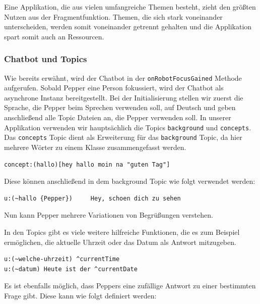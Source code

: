 Eine Applikation, die aus vielen umfangreiche Themen besteht, zieht den größten Nutzen aus der Fragmentfunktion. Themen, die sich stark voneinander unterscheiden, werden somit voneinander getrennt gehalten und die Applikation spart somit auch an Ressourcen.\\

\subsubsection{Chatbot und Topics}

Wie bereits erwähnt, wird der Chatbot in der \verb|onRobotFocusGained| Methode aufgerufen. Sobald Pepper eine Person fokussiert, wird der Chatbot als asynchrone Instanz bereitgestellt. Bei der Initialisierung stellen wir zuerst die Sprache, die Pepper beim Sprechen verwenden soll, auf Deutsch und geben anschließend alle Topic Dateien an, die Pepper verwenden soll. In unserer Applikation verwenden wir hauptsächlich die Topics \verb|background| und \verb|concepts|. Das \verb|concepts| Topic dient als Erweiterung für das \verb|background| Topic, da hier mehrere Wörter zu einem Klasse zusammengefasst werden.\\

\begin{lstlisting}[caption={Konzept - Beispiel}]
concept:(hallo)[hey hallo moin na "guten Tag"]
\end{lstlisting}

Diese können anschließend in dem background Topic wie folgt verwendet werden:\\

\begin{lstlisting}[caption={Topic - Beispiel}]
u:(~hallo {Pepper}) 	Hey, schoen dich zu sehen
\end{lstlisting}

Nun kann Pepper mehrere Variationen von Begrüßungen verstehen.

In den Topics gibt es viele weitere hilfreiche Funktionen, die es zum Beispiel ermöglichen, die aktuelle Uhrzeit oder das Datum als Antwort 
mitzugeben. \\

\begin{lstlisting}[caption={Topic - Datum}]
u:(~welche-uhrzeit) ^currentTime
u:(~datum) Heute ist der ^currentDate
\end{lstlisting}

Es ist ebenfalls möglich, dass Peppers eine zufällige Antwort zu einer bestimmten Frage gibt. Diese kann wie folgt definiert werden:\\

